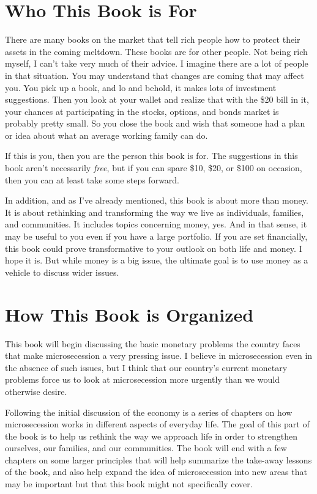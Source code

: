 \section{Who This Book is For}

There are many books on the market that tell rich people how to protect
their assets in the coming meltdown. These books are for other people.
Not being rich
myself, I can’t take
very much of their advice. I imagine there are a lot of people in that
situation. You may understand that changes are coming that may affect
you. You pick up a book, and lo and behold, it makes lots of investment
suggestions. Then you look at your wallet and realize that with the
\$20 bill in it, your chances at participating in the stocks, options,
and bonds market is probably pretty small. So you close the book and
wish that someone had a plan or idea about what an average working
family can do.

If this is you, then you are the person this book is for. The
suggestions in this book aren’t necessarily \textit{free}, but if you
can spare \$10, \$20, or \$100 on occasion, then you can at least take
some steps forward.

In addition, and
as I’ve already
mentioned, this book is about more than money. It is about rethinking
and transforming the way we live as individuals, families, and
communities. It includes topics concerning money, yes. And in that
sense, it may be useful to you even if you have a large portfolio. If
you are set financially, this book could prove transformative to your
outlook on both life and money.
I hope it is. But
while money is a big issue, the ultimate goal is to use money as a
vehicle to discuss wider issues. 

\section{How This Book is Organized}

This book will begin discussing the basic monetary problems the country
faces that make microsecession a very pressing issue. I believe in
microsecession even in the absence of such issues, but I think that
our country’s current monetary problems force us to look at
microsecession more urgently than we would otherwise desire. 

Following the initial discussion of the economy is a series of chapters
on how microsecession works in different aspects of everyday life. The
goal of this part of the book is to help us rethink the way we approach
life in order to strengthen ourselves, our families, and our
communities. The book will end with a few chapters on some larger
principles that will help summarize the take-away lessons of the book,
and also help expand the idea of microsecession into new areas
that may be important but that this book might not specifically cover.

